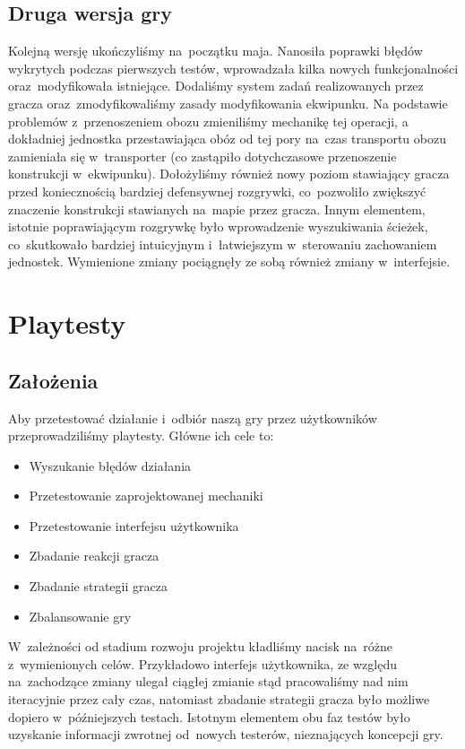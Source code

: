 \documentclass[licencjacka]{pracamgr}
\begin{document}
    \section{Druga wersja gry}
    Kolejną wersję ukończyliśmy na~początku maja. Nanosiła poprawki błędów wykrytych podczas pierwszych testów, wprowadzała kilka nowych
    funkcjonalności oraz~modyfikowała istniejące. Dodaliśmy system zadań realizowanych przez gracza oraz~zmodyfikowaliśmy zasady modyfikowania
    ekwipunku. Na podstawie problemów z~przenoszeniem obozu zmieniliśmy mechanikę tej operacji, a dokładniej jednostka przestawiająca
    obóz od tej pory na~czas transportu obozu zamieniała się w~transporter (co zastąpiło dotychczasowe przenoszenie konstrukcji w~ekwipunku).
    Dołożyliśmy również nowy poziom stawiający gracza przed koniecznością bardziej defensywnej rozgrywki,
    co~pozwoliło zwiększyć znaczenie konstrukcji stawianych na~mapie przez gracza. Innym elementem, istotnie poprawiającym
    rozgrywkę było wprowadzenie wyszukiwania ścieżek, co~skutkowało bardziej intuicyjnym i~łatwiejszym w~sterowaniu
    zachowaniem jednostek. Wymienione zmiany pociągnęły ze sobą również zmiany w~interfejsie.

\chapter{Playtesty}
  \section{Założenia}
    Aby przetestować działanie i~odbiór naszą gry przez użytkowników przeprowadziliśmy playtesty. Główne ich cele to:
    \begin{itemize}
    \item Wyszukanie błędów działania
    \item Przetestowanie zaprojektowanej mechaniki
    \item Przetestowanie interfejsu użytkownika
    \item Zbadanie reakcji gracza
    \item Zbadanie strategii gracza
    \item Zbalansowanie gry
    \end{itemize}
    W~zależności od stadium rozwoju projektu kładliśmy nacisk na~różne z~wymienionych celów. Przykładowo interfejs użytkownika,
    ze względu na~zachodzące zmiany ulegał ciągłej zmianie stąd pracowaliśmy nad nim iteracyjnie przez cały czas, natomiast
    zbadanie strategii gracza było możliwe dopiero w~późniejszych testach. Istotnym elementem obu faz testów było uzyskanie
    informacji zwrotnej od~nowych testerów, nieznających koncepcji gry.
\end{document}
